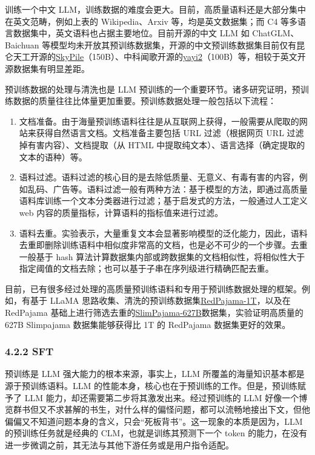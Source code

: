 \documentclass[
]{article}
\providecommand{\tightlist}{%
  \setlength{\itemsep}{0pt}\setlength{\parskip}{0pt}}
\begin{document}
训练一个中文
LLM，训练数据的难度会更大。目前，高质量语料还是大部分集中在英文范畴，例如上表的
Wikipedia、Arxiv 等，均是英文数据集；而 C4
等多语言数据集中，英文语料也占据主要地位。目前开源的中文 LLM 如
ChatGLM、Baichuan
等模型均未开放其预训练数据集，开源的中文预训练数据集目前仅有昆仑天工开源的\href{https://huggingface.co/datasets/Skywork/SkyPile-150B}{SkyPile}（150B）、中科闻歌开源的\href{https://huggingface.co/datasets/wenge-research/yayi2_pretrain_data}{yayi2}（100B）等，相较于英文开源数据集有明显差距。

预训练数据的处理与清洗也是 LLM
预训练的一个重要环节。诸多研究证明，预训练数据的质量往往比体量更加重要。预训练数据处理一般包括以下流程：

\begin{enumerate}
\def\labelenumi{\arabic{enumi}.}
\tightlist
\item
  文档准备。由于海量预训练语料往往是从互联网上获得，一般需要从爬取的网站来获得自然语言文档。文档准备主要包括
  URL 过滤（根据网页 URL 过滤掉有害内容）、文档提取（从 HTML
  中提取纯文本）、语言选择（确定提取的文本的语种）等。
\item
  语料过滤。语料过滤的核心目的是去除低质量、无意义、有毒有害的内容，例如乱码、广告等。语料过滤一般有两种方法：基于模型的方法，即通过高质量语料库训练一个文本分类器进行过滤；基于启发式的方法，一般通过人工定义
  web 内容的质量指标，计算语料的指标值来进行过滤。
\item
  语料去重。实验表示，大量重复文本会显著影响模型的泛化能力，因此，语料去重即删除训练语料中相似度非常高的文档，也是必不可少的一个步骤。去重一般基于
  hash
  算法计算数据集内部或跨数据集的文档相似性，将相似性大于指定阈值的文档去除；也可以基于子串在序列级进行精确匹配去重。
\end{enumerate}

目前，已有很多经过处理的高质量预训练语料和专用于预训练数据处理的框架。例如，有基于
LLaMA
思路收集、清洗的预训练数据集\href{https://huggingface.co/datasets/togethercomputer/RedPajama-Data-1T}{RedPajama-1T}，以及在
RedPajama
基础上进行筛选去重的\href{https://huggingface.co/datasets/cerebras/SlimPajama-627B/tree/main/train}{SlimPajama-627B}数据集，实验证明高质量的
627B Slimpajama 数据集能够获得比 1T 的 RedPajama 数据集更好的效果。

\subsubsection{4.2.2 SFT}\label{sft}

预训练是 LLM 强大能力的根本来源，事实上，LLM
所覆盖的海量知识基本都是源于预训练语料。LLM
的性能本身，核心也在于预训练的工作。但是，预训练赋予了 LLM
能力，却还需要第二步将其激发出来。经过预训练的 LLM
好像一个博览群书但又不求甚解的书生，对什么样的偏怪问题，都可以流畅地接出下文，但他偏偏又不知道问题本身的含义，只会``死板背书''。这一现象的本质是因为，LLM
的预训练任务就是经典的 CLM，也就是训练其预测下一个 token
的能力，在没有进一步微调之前，其无法与其他下游任务或是用户指令适配。
\end{document}

